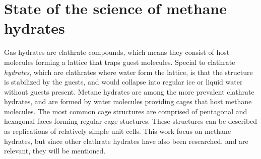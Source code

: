 \chapter{State of the science of methane hydrates}
\label{ch:state_of_the_science}
Gas hydrates are clathrate compounds, which means they consist of host molecules forming a lattice that traps guest molecules. Special to clathrate \emph{hydrates}, which are clathrates where water form the lattice, is that the structure is stabilized by the guests, and would collapse into regular ice or liquid water without guests present. Metane hydrates are among the more prevalent clathrate hydrates, and are formed by water molecules providing cages that host methane molecules. The most common cage structures are comprised of pentagonal and hexagonal faces forming regular cage stuctures. These structures can be described as replications of relatively simple unit cells. This work focus on methane hydrates, but since other clathrate hydrates have also been researched, and are relevant, they will be mentioned.

